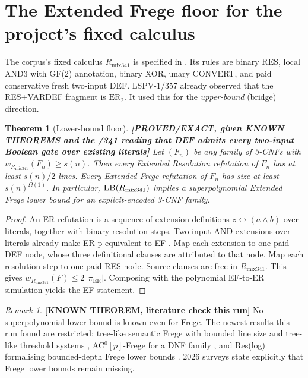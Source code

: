 \documentclass[11pt]{article}
\newtheorem{theorem}{Theorem}
\theoremstyle{remark}
\newtheorem*{remark}{Remark}
\newcommand{\status}[1]{\textbf{[#1]}}
\newcommand{\Rmix}{R_{\mathrm{mix341}}}
\begin{document}
\section{The Extended Frege floor for the project's fixed calculus}
The corpus's fixed calculus $\Rmix$ is specified in
. Its rules are
binary RES, local AND3 with GF(2) annotation, binary XOR, unary CONVERT, and paid conservative
fresh two-input DEF. LSPV-1/357 already observed that the RES+VARDEF fragment is
$\mathrm{ER}_2$. It used this for the \emph{upper-bound} (bridge) direction.

\begin{theorem}[Lower-bound floor]\label{thm:floor}
\status{PROVED/EXACT, given KNOWN THEOREMS and the /341 reading that DEF admits every
two-input Boolean gate over existing literals} Let $(F_n)$ be any family of 3-CNFs with
$w_{\Rmix}(F_n)\ge s(n)$. Then every Extended Resolution refutation of $F_n$ has at least
$s(n)/2$ lines. Every Extended Frege refutation of $F_n$ has size at least $s(n)^{\Omega(1)}$.
In particular, $\textsc{LB}(\Rmix)$ implies a superpolynomial Extended Frege lower bound for an
explicit-encoded 3-CNF family.
\end{theorem}
\begin{proof}
An ER refutation is a sequence of extension definitions $z\leftrightarrow(a\wedge b)$ over literals,
together with binary resolution steps. Two-input AND extensions over literals already make ER
p-equivalent to EF \cite{cookreckhow1979,krajicek1995}. Map each extension to one paid DEF node,
whose three definitional clauses are attributed to that node. Map each resolution step to one
paid RES node. Source clauses are free in $\Rmix$. This gives
$w_{\Rmix}(F)\le 2\,\lvert\pi_{\mathrm{ER}}\rvert$. Composing with the polynomial EF-to-ER
simulation \cite{krajicek1995} yields the EF statement.
\end{proof}

\begin{remark}
\status{KNOWN THEOREM, literature check this run} No superpolynomial lower bound is known even
for Frege. The newest results this run found are restricted: tree-like semantic Frege with bounded
line size and tree-like threshold systems \cite{drengr2026}, AC$^0[p]$-Frege for a DNF family
\cite{lst2025}, and Res(log) formalising bounded-depth Frege lower bounds \cite{davisrobere2026}.
2026 surveys state explicitly that Frege lower bounds remain missing.
\end{remark}
\end{document}

